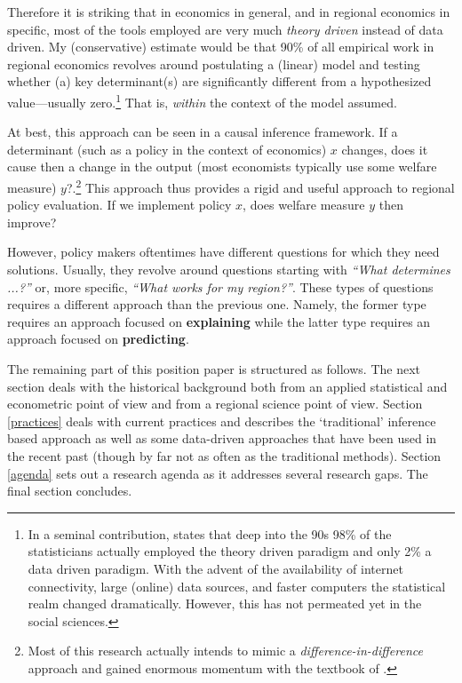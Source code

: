 \documentclass[fleqn,10pt]{SelfArx} %
\begin{document}
Therefore it is striking that in economics in general, and in regional economics in specific, most of the tools employed are very much \textit{theory driven} instead of data driven. My (conservative) estimate would be that 90\% of all empirical work in regional economics revolves around postulating a (linear) model and testing whether (a) key determinant(s) are significantly different from a hypothesized value---usually zero.\footnote{In a seminal contribution, \cite{breiman2001statistical} states that deep into the 90s 98\% of the statisticians actually employed the theory driven paradigm and only 2\% a data driven paradigm. With the advent of the availability of internet connectivity, large (online) data sources, and faster computers the statistical realm changed dramatically. However, this has not permeated yet in the social sciences.} That is, \textit{within} the context of the model assumed.

At best, this approach can be seen in a causal inference framework. If a determinant (such as a policy in the context of economics) $x$ changes, does it cause then a change in the output (most economists typically use some welfare measure) $y$?.\footnote{Most of this research actually intends to mimic a \textit{difference-in-difference} approach and gained enormous momentum with the textbook of \citet{angrist2008mostly}.} This approach thus provides a rigid and useful approach to regional policy evaluation. If we implement policy $x$, does welfare measure $y$ then improve? 

However, policy makers oftentimes have different questions for which they need solutions. Usually, they revolve around questions starting with \textit{``What determines ...?''} or, more specific, \textit{``What works for my region?''}. These types of questions requires a different approach than the previous one. Namely, the former type requires an approach focused on \textbf{explaining} while the latter type requires an approach focused on \textbf{predicting}.

The remaining part of this position paper is structured as follows. The next section deals with the historical background both from an applied statistical and econometric point of view and from a regional science point of view. Section \ref{practices} deals with current practices and describes the `traditional' inference based approach as well as some data-driven approaches that have been used in the recent past (though by far not as often as the traditional methods). Section \ref{agenda} sets out a research agenda as it addresses several research gaps. The final section concludes. 
\end{document}
